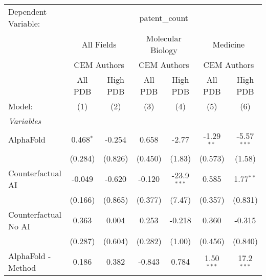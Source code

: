 \begingroup
\centering
\begin{tabular}{lcccccc}
   \tabularnewline \midrule \midrule
   Dependent Variable: & \multicolumn{6}{c}{patent\_count}\\
 & \multicolumn{2}{c}{All Fields} & \multicolumn{2}{c}{Molecular Biology} & \multicolumn{2}{c}{Medicine} \\
\cmidrule(lr){2-3} \cmidrule(lr){4-5} \cmidrule(lr){6-7}
 & \multicolumn{2}{c}{CEM Authors} & \multicolumn{2}{c}{CEM Authors} & \multicolumn{2}{c}{CEM Authors} \\
\cmidrule(lr){2-3} \cmidrule(lr){4-5} \cmidrule(lr){6-7}
 & \multicolumn{1}{c}{All PDB} & \multicolumn{1}{c}{High PDB} & \multicolumn{1}{c}{All PDB} & \multicolumn{1}{c}{High PDB} & \multicolumn{1}{c}{All PDB} & \multicolumn{1}{c}{High PDB} \\
\cmidrule(lr){2-2} \cmidrule(lr){3-3} \cmidrule(lr){4-4} \cmidrule(lr){5-5} \cmidrule(lr){6-6} \cmidrule(lr){7-7}
   Model:                                                     & (1)           & (2)           & (3)         & (4)           & (5)           & (6)\\  
   \midrule
   \emph{Variables}\\
   AlphaFold                                                  & 0.468$^{*}$   & -0.254        & 0.658       & -2.77         & -1.29$^{**}$  & -5.57$^{***}$\\   
                                                              & (0.284)       & (0.826)       & (0.450)     & (1.83)        & (0.573)       & (1.58)\\   
   Counterfactual AI                                          & -0.049        & -0.620        & -0.120      & -23.9$^{***}$ & 0.585         & 1.77$^{**}$\\   
                                                              & (0.166)       & (0.865)       & (0.377)     & (7.47)        & (0.357)       & (0.831)\\   
   Counterfactual No AI                                       & 0.363         & 0.004         & 0.253       & -0.218        & 0.360         & -0.315\\   
                                                              & (0.287)       & (0.604)       & (0.282)     & (1.00)        & (0.456)       & (0.840)\\   
   AlphaFold - Method                                         & 0.186         & 0.382         & -0.843      & 0.784         & 1.50$^{***}$  & 17.2$^{***}$\\   

\end{tabular}
